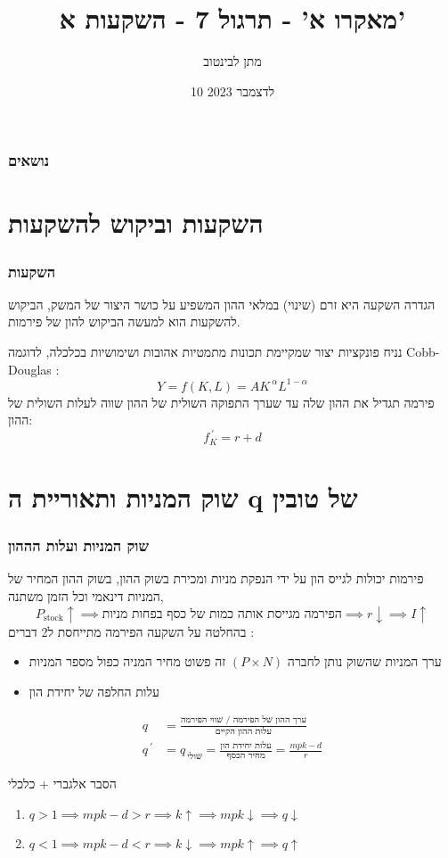 \documentclass[usenames,dvipsnames]{beamer}
\title[]{{מאקרו א' - תרגול 7 - השקעות א'}}
\author{\texthebrew{ מתן לבינטוב}}
\institute[{{ אב"ג}}]{{ אוניברסיטת בן גוריון בנגב}}
\date{10 לדצמבר 2023}
\begin{document}
\begin{RTL}
\begin{frame}
\titlepage
\end{frame}
\begin{frame}
    \frametitle{נושאים}
    \tableofcontents
    

\end{frame}
\section{השקעות וביקוש להשקעות}
\begin{frame}
    \frametitle{השקעות}
    \begin{exampleblock}{הגדרה}
        השקעה היא זרם (שינוי) במלאי ההון המשפיע על כושר היצור של המשק, הביקוש להשקעות הוא למעשה הביקוש להון של פירמות.
    \end{exampleblock}
    נניח פונקציות יצור שמקיימת תכונות מתמטיות אהובות ושימושיות בכלכלה, לדוגמה Cobb-Douglas :
    \[Y = f\left(K,L\right) = AK^{\ \alpha} L^{1-\alpha}\]
    פירמה תגדיל את ההון שלה עד שערך התפוקה השולית של ההון שווה לעלות השולית של ההון:
    \[f^{\ \prime}_K = r + d \]
    

\end{frame}
\section{שוק המניות ותאוריית ה q של טובין}
\begin{frame}[allowframebreaks]
    \frametitle{שוק המניות ועלות הההון}
    פירמות יכולות לגייס הון על ידי הנפקת מניות ומכירת בשוק ההון, בשוק ההון המחיר של המניות דינאמי וכל הזמן משתנה,
    \begin{equation*}
        P_{\text{stock}} \uparrow \implies \text{הפירמה מגייסת אותה כמות של כסף בפחות מניות} \implies r \downarrow \implies I \uparrow
    \end{equation*}
    בהחלטה על השקעה הפירמה מתייחסת ל2 דברים : 
    \begin{itemize}
        \item ערך המניות שהשוק נותן לחברה $\left(P \times N \right)$ זה פשוט מחיר המניה כפול מספר המניות
        \item עלות החלפה של יחידת הון
    \end{itemize}
    \begin{align*}
    q &= \frac{\text{ערך ההון של הפירמה / שווי הפירמה}}{\text{עלות ההון הקיים}}  \\  
    q^{\ \prime} &= q_{\ \text{שולי}} = \frac{\text{עלות יחידת הון}}{\text{מחיר הכסף}} 
     = \frac{mpk - d}{r}
    \end{align*}
    \framebreak
    \begin{block}{הסבר אלגברי + כלכלי}
        \begin{enumerate}
            \item $q > 1 \implies mpk - d > r \implies k \uparrow \implies mpk \downarrow \implies q \downarrow$
            \item $q < 1 \implies mpk - d < r \implies k \downarrow \implies mpk \uparrow \implies q \uparrow$
        \end{enumerate}


\end{block}
\end{frame}
\end{RTL}
\end{document}
